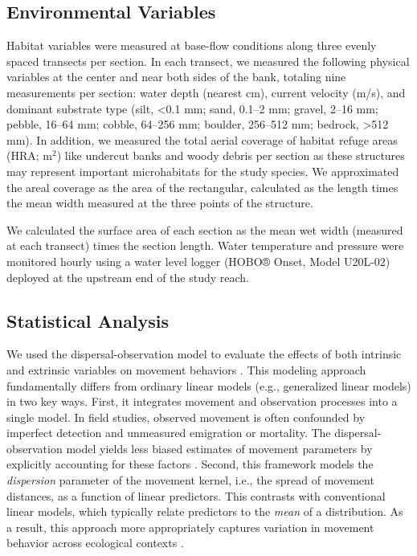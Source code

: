 \documentclass[11pt, class=article, crop=false]{standalone}
\begin{document}
\subsection{Environmental Variables}

Habitat variables were measured at base-flow conditions along three evenly spaced transects per section. In each transect, we measured the following physical variables at the center and near both sides of the bank, totaling nine measurements per section: water depth (nearest cm), current velocity (m/s), and dominant substrate type (silt, <0.1 mm; sand, 0.1--2 mm; gravel, 2--16 mm; pebble, 16--64 mm; cobble, 64--256 mm; boulder, 256--512 mm; bedrock, >512 mm). In addition, we measured the total aerial coverage of habitat refuge areas (HRA; m$^2$) like undercut banks and woody debris per section as these structures may represent important microhabitats for the study species. We approximated the areal coverage as the area of the rectangular, calculated as the length times the mean width measured at the three points of the structure.

We calculated the surface area of each section as the mean wet width (measured at each transect) times the section length. Water temperature and pressure were monitored hourly using a water level logger (HOBO® Onset, Model U20L-02) deployed at the upstream end of the study reach.

\subsection{Statistical Analysis}

We used the dispersal-observation model to evaluate the effects of both intrinsic and extrinsic variables on movement behaviors \citep{teruiModelingDispersalUsing2020, teruiNonrandomDispersalSympatric2021, teruiParasiteInfectionInduces2017, rodriguezRestrictedMovementStream2002}. This modeling approach fundamentally differs from ordinary linear models (e.g., generalized linear models) in two key ways. First, it integrates movement and observation processes into a single model. In field studies, observed movement is often confounded by imperfect detection and unmeasured emigration or mortality. The dispersal-observation model yields less biased estimates of movement parameters by explicitly accounting for these factors \citep{teruiModelingDispersalUsing2020}. Second, this framework models the \textit{dispersion} parameter of the movement kernel, i.e., the spread of movement distances, as a function of linear predictors. This contrasts with conventional linear models, which typically relate predictors to the \textit{mean} of a distribution. As a result, this approach more appropriately captures variation in movement behavior across ecological contexts \citep{teruiModelingDispersalUsing2020, pepinoFishDispersalFragmented2012, rodriguezRestrictedMovementStream2002}.
\end{document}
